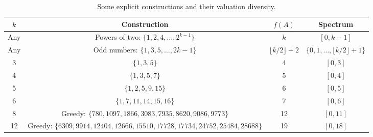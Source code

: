 \begin{table}[ht]
\centering
\begin{tabular}{c|c|c|c}
\toprule
$k$ & Construction & $f(A)$ & Spectrum \\
\midrule
Any & Powers of two: $\{1,2,4,\dots,2^{k-1}\}$ & $k$ & $[0, k-1]$ \\
Any & Odd numbers: $\{1,3,5,\dots,2k-1\}$ & $\lfloor k/2 \rfloor + 2$ & $\{0,1,\dots,\lfloor k/2 \rfloor+1\}$ \\
3 & $\{1,3,5\}$ & 4 & $[0,3]$ \\
4 & $\{1,3,5,7\}$ & 5 & $[0,4]$ \\
5 & $\{1,2,5,9,15\}$ & 6 & $[0,5]$ \\
6 & $\{1,7,11,14,15,16\}$ & 7 & $[0,6]$ \\
8 & Greedy: $\{780,1097,1866,3083,7935,8620,9086,9773\}$ & 12 & $[0,11]$ \\
12 & Greedy: $\{6309,9914,12404,12666,15510,17728,17734,24752,25484,28688\}$ & 19 & $[0,18]$ \\
\bottomrule
\end{tabular}
\caption{Some explicit constructions and their valuation diversity.}
\label{tab:constructions}
\end{table}